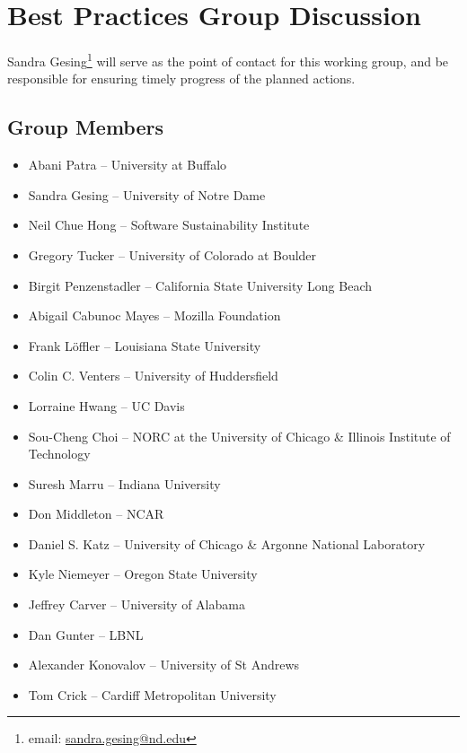 \section{Best Practices Group Discussion}
\label{sec:appendix_best_practices}

Sandra Gesing\footnote{email: \href{mailto:sandra.gesing@nd.edu}{sandra.gesing@nd.edu}} will serve as
the point of contact for this working group, and be responsible for ensuring timely progress of the planned actions.

\subsection{Group Members}

\begin{itemize}
\item Abani Patra -- University at Buffalo
\item Sandra Gesing -- University of Notre Dame
\item Neil Chue Hong -- Software Sustainability Institute
\item Gregory Tucker -- University of Colorado at Boulder
\item Birgit Penzenstadler -- California State University Long Beach
\item Abigail Cabunoc Mayes -- Mozilla Foundation
\item Frank L\"{o}ffler -- Louisiana State University 
\item Colin C. Venters --  University of Huddersfield
\item Lorraine Hwang -- UC Davis 
\item Sou-Cheng Choi -- NORC at the University of Chicago \&  Illinois Institute of Technology
\item Suresh Marru -- Indiana University
\item Don Middleton -- NCAR 
\item Daniel S. Katz --  University of Chicago \& Argonne National Laboratory
\item Kyle Niemeyer -- Oregon State University
\item Jeffrey Carver -- University of Alabama
\item Dan Gunter -- LBNL
\item Alexander Konovalov -- University of St Andrews
\item Tom Crick --  Cardiff Metropolitan University

\end{itemize}

